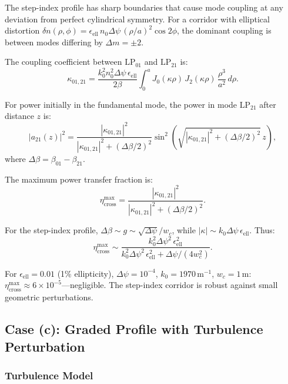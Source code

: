 \documentclass[journal,twocolumn]{IEEEtran}
\begin{document}
The step-index profile has sharp boundaries that cause mode coupling
at any deviation from perfect cylindrical symmetry. For a corridor with
elliptical distortion $\delta n(\rho,\phi) = \epsilon_\text{ell}\,n_0
\Delta\psi\,(\rho/a)^2\cos 2\phi$, the dominant coupling is between
modes differing by $\Delta m = \pm 2$.

The coupling coefficient between $\text{LP}_{01}$ and $\text{LP}_{21}$ is:
\begin{equation}
\kappa_{01,21} = \frac{k_0^2 n_0^2 \Delta\psi\,\epsilon_\text{ell}}{2\beta}
\int_0^a J_0(\kappa\rho)\,J_2(\kappa\rho)\,\frac{\rho^3}{a^2}\,d\rho.
\end{equation}

For power initially in the fundamental mode, the power in mode
$\text{LP}_{21}$ after distance $z$ is:
\begin{equation}
|a_{21}(z)|^2 = \frac{|\kappa_{01,21}|^2}
{|\kappa_{01,21}|^2 + (\Delta\beta/2)^2}
\sin^2\!\left(\sqrt{|\kappa_{01,21}|^2 + (\Delta\beta/2)^2}\,z\right),
\end{equation}
where $\Delta\beta = \beta_{01} - \beta_{21}$.

The maximum power transfer fraction is:
\begin{equation}
\eta_\text{cross}^\text{max}
= \frac{|\kappa_{01,21}|^2}{|\kappa_{01,21}|^2 + (\Delta\beta/2)^2}.
\end{equation}

For the step-index profile, $\Delta\beta \sim g \sim \sqrt{\Delta\psi}/w_c$,
while $|\kappa| \sim k_0 \Delta\psi\,\epsilon_\text{ell}$. Thus:
\begin{equation}
\eta_\text{cross}^\text{max}
\sim \frac{k_0^2\Delta\psi^2\,\epsilon_\text{ell}^2}
{k_0^2\Delta\psi^2\,\epsilon_\text{ell}^2 + \Delta\psi/(4w_c^2)}.
\end{equation}

For $\epsilon_\text{ell} = 0.01$ (1\% ellipticity), $\Delta\psi = 10^{-4}$,
$k_0 = 1970\,\text{m}^{-1}$, $w_c = 1\,\text{m}$:
$\eta_\text{cross}^\text{max} \approx 6\times10^{-5}$---negligible.
The step-index corridor is robust against small geometric perturbations.

\subsection{Case (c): Graded Profile with Turbulence Perturbation}

\subsubsection{Turbulence Model}
\end{document}
